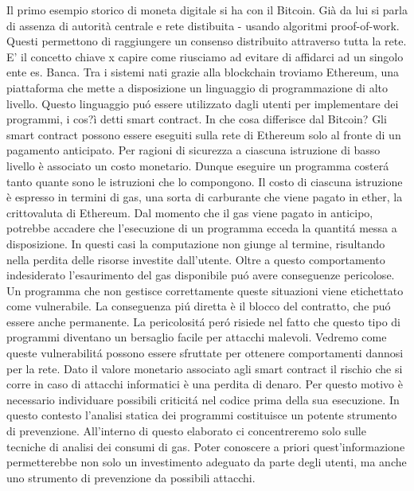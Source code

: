 Il primo esempio storico di moneta digitale si ha con il Bitcoin. Già da lui si parla di assenza di autorità centrale e rete distibuita - usando algoritmi proof-of-work. Questi permettono di raggiungere un consenso distribuito attraverso tutta la rete. E' il concetto chiave x capire come riusciamo ad evitare di affidarci ad un singolo ente es. Banca.\newline
Tra i sistemi nati grazie alla blockchain troviamo Ethereum, una piattaforma che mette a disposizione un linguaggio di programmazione di alto livello. Questo linguaggio puó essere utilizzato dagli utenti per implementare dei programmi, i cos?ì detti smart contract.\newline
In che cosa differisce dal Bitcoin?\newline
\newline
Gli smart contract possono essere eseguiti sulla rete di Ethereum solo al fronte di un pagamento anticipato. Per ragioni di sicurezza a ciascuna istruzione di basso livello è associato un costo monetario. Dunque eseguire un programma costerá tanto quante sono le istruzioni che lo compongono.
Il costo di ciascuna istruzione è espresso in termini di gas, una sorta di carburante che viene pagato in ether, la crittovaluta di Ethereum.
Dal momento che il gas viene pagato in anticipo, potrebbe accadere che l'esecuzione di un programma ecceda la quantitá messa a disposizione. In questi casi la computazione non giunge al termine, risultando nella perdita delle risorse investite dall'utente. Oltre a questo comportamento indesiderato l'esaurimento del gas disponibile puó avere conseguenze pericolose.
Un programma che non gestisce correttamente queste situazioni viene etichettato come vulnerabile. La conseguenza piú diretta è il blocco del contratto, che puó essere anche permanente. La pericolositá peró risiede nel fatto che questo tipo di programmi diventano un bersaglio facile per attacchi malevoli. Vedremo come queste vulnerabilitá possono essere sfruttate per ottenere
comportamenti dannosi per la rete.\newline
Dato il valore monetario associato agli smart contract il rischio che si corre in caso di attacchi informatici è una perdita di denaro. Per questo motivo è necessario individuare possibili criticitá nel codice prima della sua esecuzione. In questo contesto l'analisi statica dei programmi costituisce un potente
strumento di prevenzione.\newline
\newline
All'interno di questo elaborato ci concentreremo solo sulle tecniche di analisi dei consumi di gas. Poter conoscere a priori quest'informazione permetterebbe non solo un investimento adeguato da parte degli utenti, ma anche uno strumento di prevenzione da possibili attacchi.\newline
